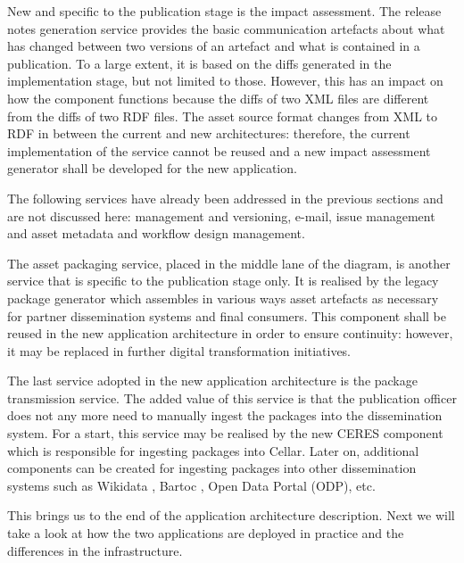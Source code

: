 	New and specific to the publication stage is the impact assessment. The release notes generation service provides the basic communication artefacts about what has changed between two versions of an artefact and what is contained in a publication. To a large extent, it is based on the diffs generated in the implementation stage, but not limited to those. However, this has an impact on how the component functions because the diffs of two XML files are different from the diffs of two RDF files. The asset source format changes from XML to RDF in between the current and new architectures: therefore, the current implementation of the service cannot be reused and a new impact assessment generator shall be developed for the new application. 

	The following services have already been addressed in the previous sections and are not discussed here: management and versioning, e-mail, issue management and asset metadata and workflow design management. 
	
	The asset packaging service, placed in the middle lane of the diagram, is another service that is specific to the publication stage only. It is realised by the legacy package generator which assembles in various ways asset artefacts as necessary for partner dissemination systems and final consumers. This component shall be reused in the new application architecture in order to ensure continuity: however, it may be replaced in further digital transformation initiatives. 
	
	The last service adopted in the new application architecture is the package transmission service. The added value of this service is that the publication officer does not any more need to manually ingest the packages into the dissemination system. For a start, this service may be realised by the new CERES component which is responsible for ingesting packages into Cellar. Later on, additional components can be created for ingesting packages into other dissemination systems such as Wikidata \citep{vrandevcic2014wikidata}, Bartoc \citep{ledl2016describing}, Open Data Portal (ODP), etc. 
	
	This brings us to the end of the application architecture description. Next we will take a look at how the two applications are deployed in practice and the differences in the infrastructure.